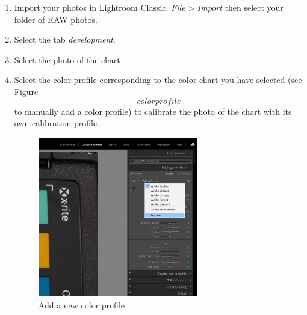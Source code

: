 \documentclass[
]{book}
\begin{document}
\begin{enumerate}
\def\labelenumi{\arabic{enumi}.}
\item
  Import your photos in Lightroom Classic. \emph{File} \textgreater{} \emph{Import} then
  select your folder of RAW photos.
\item
  Select the tab \emph{development}.
\item
  Select the photo of the chart
\item
  Select the color profile corresponding to the color chart you have
  selected (see Figure
  \protect\hyperlink{colorux5cux2520profile}{\[color profile\]} to manually add a color profile) to
  calibrate the photo of the chart with its own calibration profile.

  \begin{figure}
  \hypertarget{add_profile}{%
  \centering
  \includegraphics[width=\textwidth,height=7cm]{Figures/profil_capture_1.png}
  \caption{Add a new color
  profile}\label{add_profile}
  }
  \end{figure}


\end{enumerate}
\end{document}
